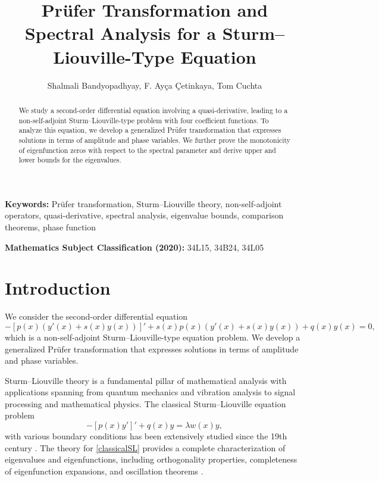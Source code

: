\documentclass[11pt, reqno]{amsart}
\title{Pr\"ufer Transformation and Spectral Analysis for a Sturm--Liouville-Type Equation}
\author{Shalmali Bandyopadhyay, F. Ay\c{c}a \c{C}etinkaya, Tom Cuchta}
\date{}
\numberwithin{equation}{section}  %
\theoremstyle{plain}
\theoremstyle{definition}
\theoremstyle{remark}
\begin{document}
\begin{abstract}
We study a second-order differential equation involving a quasi-derivative, leading to a non-self-adjoint Sturm--Liouville-type problem with four coefficient functions. To analyze this equation, we develop a generalized Pr\"ufer transformation that expresses solutions in terms of amplitude and phase variables. We further prove the monotonicity of eigenfunction zeros with respect to the spectral parameter and derive upper and lower bounds for the eigenvalues.
\end{abstract}
\maketitle
\noindent \textbf{Keywords:} Pr\"ufer transformation, Sturm--Liouville theory, non-self-adjoint operators, quasi-derivative, spectral analysis, eigenvalue bounds, comparison theorems, phase function

\noindent \textbf{Mathematics Subject Classification (2020):} 34L15, 34B24, 34L05


\section{Introduction}

We consider the second-order differential equation
\begin{equation}
\label{1}
-\left[p(x)(y'(x) + s(x)y(x))\right]' + s(x)p(x)(y'(x) + s(x)y(x)) + q(x)y(x) = 0,
\end{equation}
which is a non-self-adjoint Sturm--Liouville-type {equation} problem. We develop a generalized Pr\"ufer transformation that expresses solutions in terms of amplitude and phase variables. 

Sturm--Liouville theory is a fundamental pillar of mathematical analysis with applications spanning from quantum mechanics and vibration analysis to signal processing and mathematical physics. The classical Sturm--Liouville {equation} problem 
\begin{equation}
-[p(x)y']' + q(x)y = \lambda w(x)y,\label{classicalSL}
\end{equation}
with various boundary conditions has been extensively studied since the 19th century \cite{sturm1836, sturm1837}. The theory for \eqref{classicalSL} provides a complete characterization of eigenvalues and eigenfunctions, including orthogonality properties, completeness of eigenfunction expansions, and oscillation theorems \cite{coddington1955, titchmarsh1962}.
\end{document}
